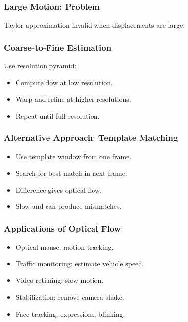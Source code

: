 \begin{frame}
  \frametitle{Large Motion: Problem}
Taylor approximation invalid when displacements are large.

\vspace{0.5cm}
\centering
\end{frame}

\begin{frame}
  \frametitle{Coarse-to-Fine Estimation}
Use resolution pyramid:
\begin{itemize}
  \item Compute flow at low resolution.
  \item Warp and refine at higher resolutions.
  \item Repeat until full resolution.
\end{itemize}

\vspace{0.5cm}
\centering
\end{frame}

\begin{frame}
  \frametitle{Alternative Approach: Template Matching}
\begin{itemize}
  \item Use template window from one frame.
  \item Search for best match in next frame.
  \item Difference gives optical flow.
  \item Slow and can produce mismatches.
\end{itemize}

\vspace{0.5cm}
\centering
\end{frame}

\begin{frame}
  \frametitle{Applications of Optical Flow}
\begin{itemize}
  \item Optical mouse: motion tracking.
  \item Traffic monitoring: estimate vehicle speed.
  \item Video retiming: slow motion.
  \item Stabilization: remove camera shake.
  \item Face tracking: expressions, blinking.
\end{itemize}

\vspace{0.5cm}
\centering
\end{frame}

